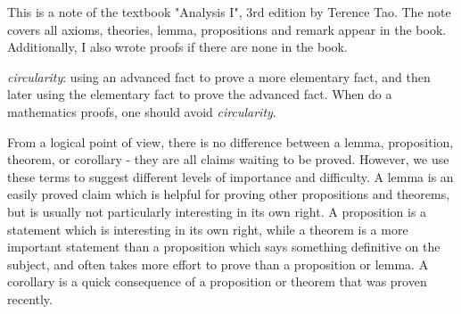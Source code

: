 This is a note of the textbook "Analysis I", 3rd edition by Terence Tao.
The note covers all axioms, theories, lemma, propositions and remark appear in the book.
Additionally, I also wrote proofs if there are none in the book.

\begin{note}\label{circularity}
\emph{circularity}: using an advanced fact to prove a more elementary fact, and then later using the elementary fact to prove the advanced fact.
When do a mathematics proofs, one should avoid \emph{circularity}.
\end{note}

\begin{note}
From a logical point of view, there is no difference between a lemma, proposition, theorem, or corollary - they are all claims waiting to be proved.
However, we use these terms to suggest different levels of importance and difficulty.
A lemma is an easily proved claim which is helpful for proving other propositions and theorems, but is usually not particularly interesting in its own right.
A proposition is a statement which is interesting in its own right, while a theorem is a more important statement than a proposition which says something definitive on the subject, and often takes more effort to prove than a proposition or lemma.
A corollary is a quick consequence of a proposition or theorem that was proven recently.
\end{note}